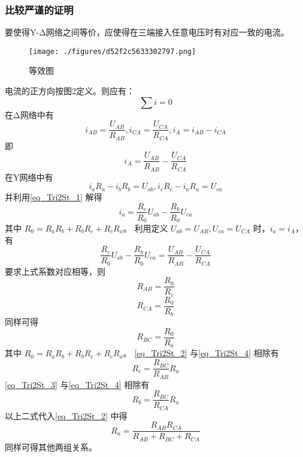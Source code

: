 \subsubsection{比较严谨的证明}
要使得Y-Δ网络之间等价，应使得在三端接入任意电压时有对应一致的电流。
\begin{figure}[ht]
\centering
\texttt{[image: ./figures/d52f2c5633302797.png]}
\caption{等效图} \label{fig_Tri2St_2}
\end{figure}
电流的正方向按图2定义。则应有：
\begin{equation}\label{eq_Tri2St_1}
\sum{i}=0
\end{equation}
在Δ网络中有
\begin{equation}
i_{AB}=\frac{U_{AB}}{R_{AB}},i_{CA}=\frac{U_{CA}}{R_{CA}},i_A=i_{AB}-i_{CA}
\end{equation}
即
\begin{equation}
i_A=\frac{U_{AB}}{R_{AB}}-\frac{U_{CA}}{R_{CA}}
\end{equation}
在Y网络中有
\begin{equation}
i_a R_a-i_b R_b=U_{ab},i_c R_c-i_a R_a=U_{ca}
\end{equation}
并利用\autoref{eq_Tri2St_1} 解得
\begin{equation}
i_a=\frac{R_c}{R_0}U_{ab}-\frac{R_b}{R_0}U_{ca}
\end{equation}
其中 $R_0 = R_a R_b + R_b R_c + R_c R_a$。
利用定义 $U_{ab}=U_{AB},U_{ca}=U_{CA}$ 时，$i_a=i_A$，有
\begin{equation}
\frac{R_c}{R_0}U_{ab}-\frac{R_b}{R_0}U_{ca}=\frac{U_{AB}}{R_{AB}}-\frac{U_{CA}}{R_{CA}}
\end{equation}
要求上式系数对应相等，则
\begin{equation}\label{eq_Tri2St_2}
R_{AB}=\frac{R_0}{R_c}
\end{equation}
\begin{equation}\label{eq_Tri2St_3}
R_{CA}=\frac{R_0}{R_b}
\end{equation}
同样可得
\begin{equation}\label{eq_Tri2St_4}
R_{BC}=\frac{R_0}{R_a}
\end{equation}
其中 $R_0 = R_a R_b + R_b R_c + R_c R_a$。
\autoref{eq_Tri2St_2} 与\autoref{eq_Tri2St_4} 相除有
\begin{equation}
R_c=\frac{R_{BC}}{R_{AB}}R_a
\end{equation}
\autoref{eq_Tri2St_3} 与\autoref{eq_Tri2St_4} 相除有
\begin{equation}
R_b=\frac{R_{BC}}{R_{CA}}R_a
\end{equation}
以上二式代入\autoref{eq_Tri2St_2} 中得
\begin{equation}
R_a=\frac{R_{AB} R_{CA}}{R_{AB}+R_{BC}+R_{CA}}
\end{equation}
同样可得其他两组关系。
